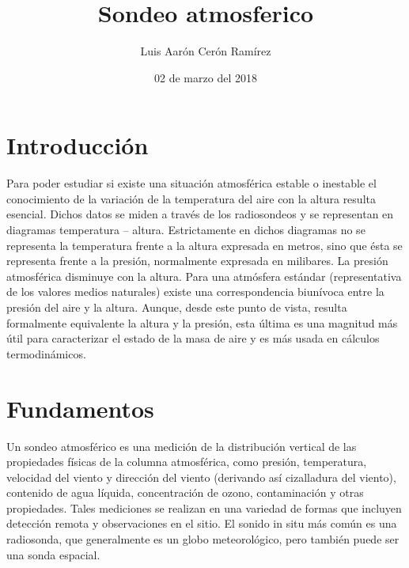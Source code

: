 \documentclass{article}
\title{Sondeo atmosferico}
\author{Luis Aarón Cerón Ramírez}
\date{02 de marzo del 2018}
\begin{document}
\maketitle
\section{Introducción}
Para poder estudiar si existe una situación atmosférica estable o inestable el conocimiento de la variación de la temperatura del aire con la altura resulta esencial. Dichos datos se miden a través de los radiosondeos y se representan en diagramas temperatura – altura. Estrictamente en dichos diagramas no se representa la temperatura frente a la altura expresada en metros, sino que ésta se representa frente a la presión, normalmente expresada en milibares. La presión atmosférica disminuye con la altura. Para una atmósfera estándar (representativa de los valores medios naturales) existe una correspondencia biunívoca entre la presión del aire y la altura. Aunque, desde este punto de vista, resulta formalmente equivalente la altura y la presión, esta última es una magnitud más útil para caracterizar el estado de la masa de aire y es más usada en cálculos termodinámicos.
\section{Fundamentos}
Un sondeo atmosférico es una medición de la distribución vertical de las propiedades físicas de la columna atmosférica, como presión, temperatura, velocidad del viento y dirección del viento (derivando así cizalladura del viento), contenido de agua líquida, concentración de ozono, contaminación y otras propiedades. Tales mediciones se realizan en una variedad de formas que incluyen detección remota y observaciones en el sitio.
El sonido in situ más común es una radiosonda, que generalmente es un globo meteorológico, pero también puede ser una sonda espacial.
\end{document}
